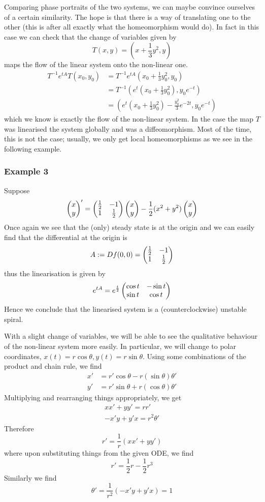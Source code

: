 Comparing phase portraits of the two systems, we can maybe convince ourselves of a certain similarity. The hope is that there is a way of translating one to the other (this is after all exactly what the homeomorphism would do). In fact in this case we can check that the change of variables given by
$$ T(x, y) = \left( x + \frac{1}{3}y^2, y \right) $$
maps the flow of the linear system onto the non-linear one.
\begin{align*}
    T^{-1} e^{tA} T(x_0, y_0) &= T^{-1} e^{tA} \left( x_0 + \frac{1}{3} y_0^2, y_0 \right)\\
    &= T^{-1}\left( e^t \left(x_0 + \frac{1}{3} y_0^2 \right), y_0 e^{-t} \right)\\
    &= \left( e^t \left(x_0 + \frac{1}{3} y_0^2 \right) - \frac{y_0^2}{3}e^{-2t}, y_0e^{-t} \right)
\end{align*}
which we know is exactly the flow of the non-linear system. In the case the map $T$ was linearised the system globally and was a diffeomorphism. Most of the time, this is not the case; usually, we only get local homeomorphisms as we see in the following example.

\subsubsection{Example 3}
Suppose 
$$ \begin{pmatrix} x\\y \end{pmatrix}' = \begin{pmatrix} \frac{1}{2} & -1\\1 & \frac{1}{2} \end{pmatrix} \begin{pmatrix} x\\y \end{pmatrix} - \frac{1}{2}(x^2 + y^2) \begin{pmatrix} x\\y \end{pmatrix} $$
Once again we see that the (only) steady state is at the origin and we can easily find that the differential at the origin is
$$ A := Df(0, 0) = \begin{pmatrix} \frac{1}{2} & -1\\1 & \frac{1}{2} \end{pmatrix} $$
thus the linearisation is given by
$$ e^{tA} = e^{\frac{t}{2}} \begin{pmatrix} \cos t & -\sin t\\ \sin t & \cos t \end{pmatrix} $$
Hence we conclude that the linearised system is a (counterclockwise) unstable spiral. 

With a slight change of variables, we will be able to see the qualitative behaviour of the non-linear system more easily. In particular, we will change to polar coordinates, $x(t) = r \cos \theta, y(t) = r \sin \theta$. Using some combinations of the product and chain rule, we find
\begin{align*}
    x' &= r' \cos\theta - r (\sin \theta) \theta'\\
    y' &= r' \sin \theta + r(\cos \theta) \theta'
\end{align*}
Multiplying and rearranging things appropriately, we get
\begin{align*}
    x x' + y y' = r r'\\
    -x'y + y'x = r^2 \theta'
\end{align*}
Therefore
$$ r' = \frac{1}{r} (xx' + y y') $$
where upon substituting things from the given ODE, we find 
$$ r' = \frac{1}{2} r - \frac{1}{2} r^3 $$
Similarly we find
$$ \theta' = \frac{1}{r^2} (-x'y + y'x) = 1 $$

